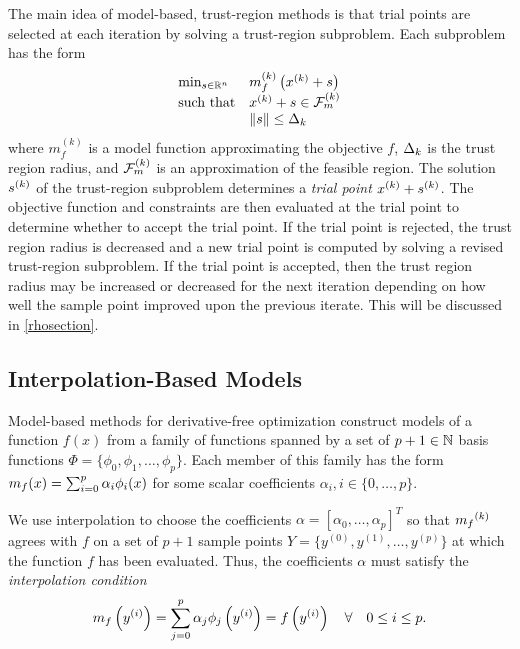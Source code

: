 \documentclass{article}
\begin{document}
The main idea of model-based, trust-region methods is that trial points are selected at each iteration by solving a trust-region subproblem.  
Each subproblem has the form 
\[ \begin{array}{ll} \min_{s \in \mathbb R^n} & m_f^{(k)}\left(x^{(k)} + s\right) \\ 
\textrm{such that} & x^{(k)}+s \in {\mathcal F_m^{(k)}} \\
& {\left\|s\right\|} \le \Delta_k
\end{array} \]
where $m_f^{(k)}$ is a model function approximating the objective $f$, $\Delta_k$ is the trust region radius,
and ${\mathcal F_m^{(k)}}$ is an approximation of the feasible region.
The solution ${{s}^{(k)}}$ of the trust-region subproblem determines a {\em trial point} $x^{(k)} + {{s}^{(k)}}$.  
The objective function and constraints are then evaluated at the trial point to determine whether to accept the trial point.
If the trial point is rejected, the trust region radius is decreased and a new trial point is computed by solving a revised trust-region subproblem.     
If the trial point is accepted, then the trust region radius may be increased or decreased for the next iteration 
depending on how well the sample point improved upon the previous iterate.
This will be discussed in \cref{rhosection}.





\subsection{Interpolation-Based Models}

\label{interpolation}

Model-based methods for derivative-free optimization construct models of a function $f(x)$ from a family of functions spanned by a set of $p + 1 \in \mathbb N$ basis functions  $\Phi = \{\phi_0, \phi_1, \ldots, \phi_p\}$. Each member of this family has the form ${{m}_f}(x) = \sum_{i=0}^p\alpha_i\phi_i(x)$ for some scalar coefficients $\alpha_i, i \in \{0, \ldots, p\}$.

We use interpolation to choose the coefficients $\alpha = [\alpha_0, \ldots, \alpha_p]^T$ so that ${{m}_f}^{(k)}$ agrees with $f$ on a set of $p+1$ sample points $Y = \{y^{(0)}, y^{(1)}, \ldots, y^{(p)}\}$ at which the function $f$ has been evaluated.
Thus, the coefficients $\alpha$ must satisfy the \emph{interpolation condition}
\begin{align}
\label{interpolation_condition}
{{m}_f}\left(y^{(i)}\right) = \sum^p_{j=0}\alpha_j\phi_j\left(y^{(i)}\right) = f\left(y^{(i)}\right) \quad \forall \quad 0 \le i \le p.
\end{align}
\end{document}
